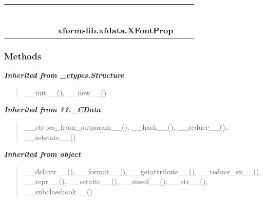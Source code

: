     \label{xformslib:xfdata:XFontProp}
\begin{tabular}{cccccccccc}
\multicolumn{2}{r}{\settowidth{\BCL}{object}\multirow{2}{\BCL}{object}}
&&
&&
&&
  \\\cline{3-3}
  &&\multicolumn{1}{c|}{}
&&
&&
&&
  \\
\multicolumn{4}{r}{\settowidth{\BCL}{??.\_CData}\multirow{2}{\BCL}{??.\_CData}}
&&
&&
  \\\cline{5-5}
  &&&&\multicolumn{1}{c|}{}
&&
&&
  \\
\multicolumn{6}{r}{\settowidth{\BCL}{\_ctypes.Structure}\multirow{2}{\BCL}{\_ctypes.Structure}}
&&
  \\\cline{7-7}
  &&&&&&\multicolumn{1}{c|}{}
&&
  \\
&&&&&&\multicolumn{2}{l}{\textbf{xformslib.xfdata.XFontProp}}
\end{tabular}



  \subsubsection{Methods}


\large{\textbf{\textit{Inherited from \_ctypes.Structure}}}

\begin{quote}
\_\_init\_\_(), \_\_new\_\_()
\end{quote}

\large{\textbf{\textit{Inherited from ??.\_CData}}}

\begin{quote}
\_\_ctypes\_from\_outparam\_\_(), \_\_hash\_\_(), \_\_reduce\_\_(), \_\_setstate\_\_()
\end{quote}

\large{\textbf{\textit{Inherited from object}}}

\begin{quote}
\_\_delattr\_\_(), \_\_format\_\_(), \_\_getattribute\_\_(), \_\_reduce\_ex\_\_(), \_\_repr\_\_(), \_\_setattr\_\_(), \_\_sizeof\_\_(), \_\_str\_\_(), \_\_subclasshook\_\_()
\end{quote}


